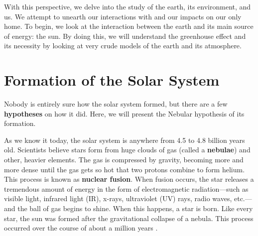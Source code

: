     With this perspective, we delve into the study of the earth, its environment, and us. We attempt to unearth our interactions with and our impacts on our only home. To begin, we look at the interaction between the earth and its main source of energy: the sun. By doing this, we will understand the greenhouse effect and its necessity by looking at very crude models of the earth and its atmosphere. 


    \section{\label{sec:solar_sys}Formation of the Solar System}

    Nobody is entirely sure how the solar system formed, but there are a few \textbf{hypotheses} on how it did. Here, we will present the Nebular hypothesis of its formation.

    As we know it today, the solar system is anywhere from 4.5 to 4.8 billion years old. Scientists believe stars form from huge clouds of gas (called a \textbf{nebulae}) and other, heavier elements. The gas is compressed by gravity, becoming more and more dense until the gas gets so hot that two protons combine to form helium. %
    This process is known as \textbf{nuclear fusion}. When fusion occurs, the star releases a tremendous amount of energy in the form of electromagnetic radiation---such as visible light, infrared light (IR), x-rays, ultraviolet (UV) rays, radio waves, etc.---and the ball of gas begins to shine. When this happens, a star is born. Like every star, the sun was formed after the gravitational collapse of a nebula. This process occurred over the course of about a million years \citep{formation_solar}.

